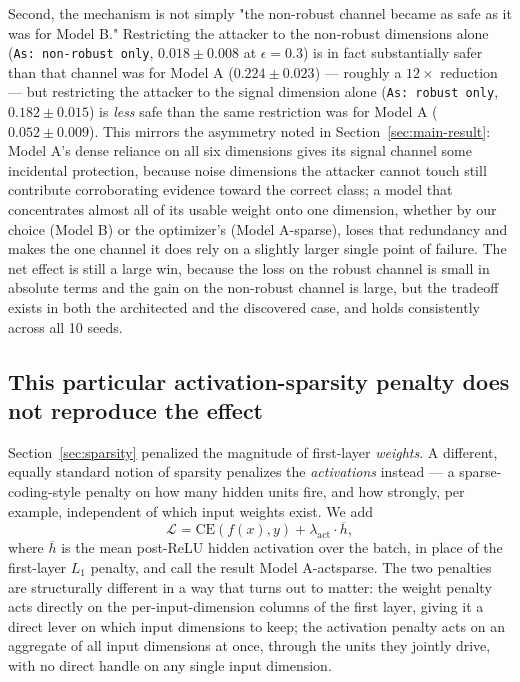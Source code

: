 \documentclass[11pt]{article}
\begin{document}
Second, the mechanism is not simply "the non-robust channel became as safe
as it was for Model B." Restricting the attacker to the non-robust
dimensions alone (\texttt{As: non-robust only}, $0.018\pm0.008$ at
$\epsilon=0.3$) is in fact substantially safer than that channel was for
Model A ($0.224\pm0.023$) --- roughly a $12\times$ reduction --- but
restricting the attacker to the signal dimension alone (\texttt{As:
robust only}, $0.182\pm0.015$) is \emph{less} safe than the same
restriction was for Model A ($0.052\pm0.009$). This mirrors the asymmetry
noted in Section~\ref{sec:main-result}: Model A's dense reliance on all
six dimensions gives its signal channel some incidental protection,
because noise dimensions the attacker cannot touch still contribute
corroborating evidence toward the correct class; a model that concentrates
almost all of its usable weight onto one dimension, whether by our choice
(Model B) or the optimizer's (Model A-sparse), loses that redundancy and
makes the one channel it does rely on a slightly larger single point of
failure. The net effect is still a large win, because the loss on the
robust channel is small in absolute terms and the gain on the non-robust
channel is large, but the tradeoff exists in both the architected and the
discovered case, and holds consistently across all 10 seeds.

\subsection{This particular activation-sparsity penalty does not reproduce the effect}
\label{sec:actsparsity}

Section~\ref{sec:sparsity} penalized the magnitude of first-layer
\emph{weights}. A different, equally standard notion of sparsity penalizes
the \emph{activations} instead --- a sparse-coding-style penalty on how
many hidden units fire, and how strongly, per example, independent of
which input weights exist. We add
\[
\mathcal L = \mathrm{CE}(f(x), y) + \lambda_{\mathrm{act}} \cdot
\overline{h},
\]
where $\overline h$ is the mean post-ReLU hidden activation over the
batch, in place of the first-layer $L_1$ penalty, and call the result
Model A-actsparse. The two penalties are structurally different in a way
that turns out to matter: the weight penalty acts directly on the
per-input-dimension columns of the first layer, giving it a direct lever
on which input dimensions to keep; the activation penalty acts on an
aggregate of all input dimensions at once, through the units they jointly
drive, with no direct handle on any single input dimension.
\end{document}
